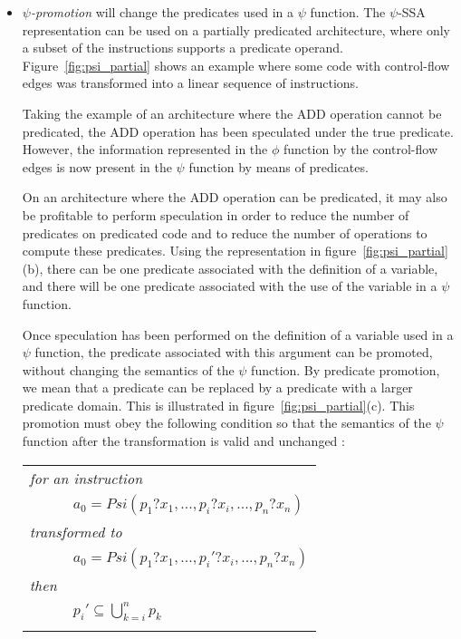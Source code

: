 \begin{itemize}

\item{\emph{$\psi$-promotion}} will change the predicates used in a
  $\psi$ function. The $\psi$-SSA representation can be used on a
  partially predicated architecture, where only a subset of the
  instructions supports a predicate operand.
  Figure~\ref{fig:psi_partial} shows an example where some code with
  control-flow edges was transformed into a linear sequence of
  instructions.

Taking the example of an architecture where the {ADD} operation
cannot be predicated, the {ADD} operation has been speculated
under the {true} predicate. However, the information represented
in the $\phi$ function by the control-flow edges is now present in the
$\psi$ function by means of predicates.

On an architecture where the {ADD} operation can be predicated, it
may also be profitable to perform speculation in order to reduce the
number of predicates on predicated code and to reduce the number of
operations to compute these predicates. Using the representation in
figure~\ref{fig:psi_partial} (b), there can be one predicate associated
with the definition of a variable, and there will be one predicate
associated with the use of the variable in a $\psi$ function.

Once speculation has been performed on the definition of a variable
used in a $\psi$ function, the predicate associated with this argument
can be promoted, without changing the semantics of the $\psi$
function. By predicate promotion, we mean that a predicate can be
replaced by a predicate with a larger predicate domain. This is
illustrated in figure~\ref{fig:psi_partial}(c). This promotion must
obey the following condition so that the semantics of the $\psi$
function after the transformation is valid and unchanged :

\begin{tabular}{ll}
\multicolumn{2}{l}{\it for an instruction} \\
\ \ \ \ & {$ {a_0 = Psi(p_1?x_1, ..., p_i?x_i, ..., p_n?x_n)}$} \\
\multicolumn{2}{l}{\it transformed to} \\
\ \ \ \ & {$ {a_0 = Psi(p_1?x_1, ..., p_i'?x_i, ..., p_n?x_n)}$} \\
\multicolumn{2}{l}{\it then} \\
\ \ \ \ & {${p_i' \subseteq \bigcup_{k=i}^n p_k}$} \\
\\
\end{tabular}


\end{itemize}
